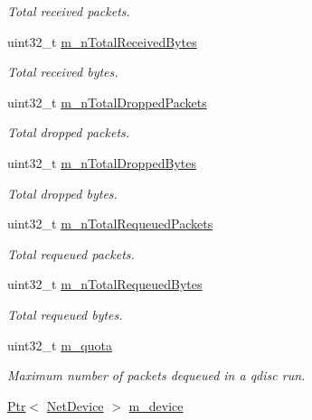 \begin{DoxyCompactItemize}
\begin{DoxyCompactList}\small\item\em Total received packets. \end{DoxyCompactList}\item 
uint32\+\_\+t \hyperlink{classns3_1_1QueueDisc_a8ebcd87d1d417d30e1e916a406c681c0}{m\+\_\+n\+Total\+Received\+Bytes}
\begin{DoxyCompactList}\small\item\em Total received bytes. \end{DoxyCompactList}\item 
uint32\+\_\+t \hyperlink{classns3_1_1QueueDisc_a2974596141f300298255f0ae85faf0cc}{m\+\_\+n\+Total\+Dropped\+Packets}
\begin{DoxyCompactList}\small\item\em Total dropped packets. \end{DoxyCompactList}\item 
uint32\+\_\+t \hyperlink{classns3_1_1QueueDisc_a06645b0916c11b3da27195ed99ca8ce7}{m\+\_\+n\+Total\+Dropped\+Bytes}
\begin{DoxyCompactList}\small\item\em Total dropped bytes. \end{DoxyCompactList}\item 
uint32\+\_\+t \hyperlink{classns3_1_1QueueDisc_a098d0d792113e93b94c8f89178ac2af6}{m\+\_\+n\+Total\+Requeued\+Packets}
\begin{DoxyCompactList}\small\item\em Total requeued packets. \end{DoxyCompactList}\item 
uint32\+\_\+t \hyperlink{classns3_1_1QueueDisc_aa1c2f1af9a66078a2507d2632eef82ae}{m\+\_\+n\+Total\+Requeued\+Bytes}
\begin{DoxyCompactList}\small\item\em Total requeued bytes. \end{DoxyCompactList}\item 
uint32\+\_\+t \hyperlink{classns3_1_1QueueDisc_a4f7e8c8503be408b6bbf82e0648c9fc8}{m\+\_\+quota}
\begin{DoxyCompactList}\small\item\em Maximum number of packets dequeued in a qdisc run. \end{DoxyCompactList}\item 
\hyperlink{classns3_1_1Ptr}{Ptr}$<$ \hyperlink{classns3_1_1NetDevice}{Net\+Device} $>$ \hyperlink{classns3_1_1QueueDisc_ad9a47fe0eb33b8e1ef760966b1ad6b7c}{m\+\_\+device}

\end{DoxyCompactItemize}
